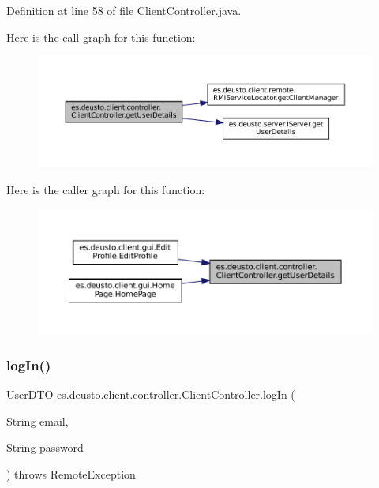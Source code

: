 Definition at line 58 of file Client\+Controller.\+java.

Here is the call graph for this function\+:
\nopagebreak
\begin{figure}[H]
\begin{center}
\leavevmode
\includegraphics[width=350pt]{classes_1_1deusto_1_1client_1_1controller_1_1_client_controller_ac1bd9affe27668ee49320daae38d67a0_cgraph}
\end{center}
\end{figure}
Here is the caller graph for this function\+:
\nopagebreak
\begin{figure}[H]
\begin{center}
\leavevmode
\includegraphics[width=350pt]{classes_1_1deusto_1_1client_1_1controller_1_1_client_controller_ac1bd9affe27668ee49320daae38d67a0_icgraph}
\end{center}
\end{figure}
\mbox{\label{classes_1_1deusto_1_1client_1_1controller_1_1_client_controller_a075c2e627be920454324dacbbc72295c}} 
\subsubsection{\texorpdfstring{logIn()}{logIn()}}
{\footnotesize\ttfamily \mbox{\hyperlink{classes_1_1deusto_1_1server_1_1data_1_1_user_d_t_o}{User\+D\+TO}} es.\+deusto.\+client.\+controller.\+Client\+Controller.\+log\+In (\begin{DoxyParamCaption}\item[{String}]{email,  }\item[{String}]{password }\end{DoxyParamCaption}) throws Remote\+Exception}




